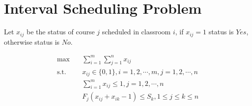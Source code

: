 \section{Interval Scheduling Problem}
Let $x_{ij}$ be the status of course $j$ scheduled in classroom $i$, if $x_{ij} = 1$ status is $Yes$, otherwise status is $No$.

\[
	\begin{split}
		\max & \quad \sum_{i=1}^{m} \sum_{j=1}^{n} x_{ij} \\
		\text{s.t.} & \quad x_{ij} \in \{0,1 \} , i=1,2,\cdots, m , j = 1,2,\cdots, n \\
		&\quad  \sum_{i=1}^{m}x_{ij} \leq 1 , j =1,2,\cdots, n \\
		&\quad F_j(x_{ij} + x_{ik} - 1  ) \leq S_k,  1\leq j \leq k \leq n
	\end{split}
\]